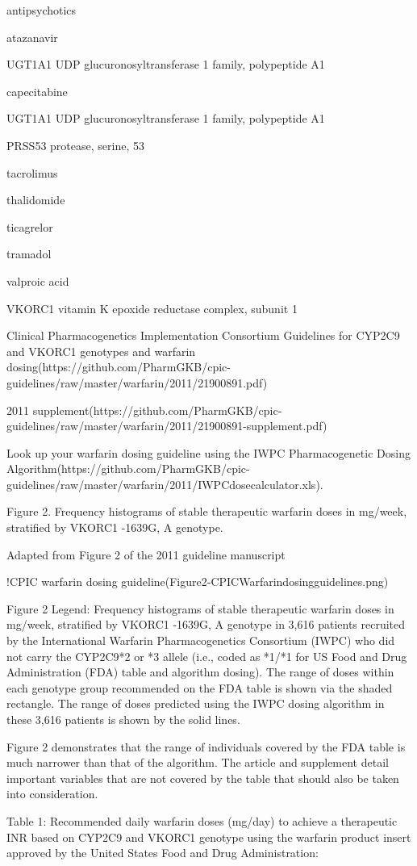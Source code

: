 \documentclass{resume} %
\begin{document}
\begin{rSection}{ antipsychotics }
\begin{rSection}{ atazanavir }
\begin{rSubsection}{ UGT1A1 }{ UDP glucuronosyltransferase 1 family, polypeptide A1 }{}{}
\begin{rSection}{ capecitabine }
\begin{rSubsection}{ UGT1A1 }{ UDP glucuronosyltransferase 1 family, polypeptide A1 }{}{}
\begin{rSubsection}{ PRSS53 }{ protease, serine, 53 }{}{}
\begin{rSection}{ tacrolimus }
\begin{rSection}{ thalidomide }
\begin{rSection}{ ticagrelor }
\begin{rSection}{ tramadol }
\begin{rSection}{ valproic acid }
\begin{rSubsection}{ VKORC1 }{ vitamin K epoxide reductase complex, subunit 1 }{}{}
\item Clinical Pharmacogenetics Implementation Consortium Guidelines for CYP2C9 and VKORC1 genotypes and warfarin dosing(https://github.com/PharmGKB/cpic-guidelines/raw/master/warfarin/2011/21900891.pdf)
 \newline
\item 2011 supplement(https://github.com/PharmGKB/cpic-guidelines/raw/master/warfarin/2011/21900891-supplement.pdf)
 \newline
\item Look up your warfarin dosing guideline using the IWPC Pharmacogenetic Dosing Algorithm(https://github.com/PharmGKB/cpic-guidelines/raw/master/warfarin/2011/IWPCdosecalculator.xls).
 \newline
\item Figure 2. Frequency histograms of stable therapeutic warfarin doses in mg/week, stratified by VKORC1 -1639G, A genotype.
 \newline
\item Adapted from Figure 2 of the 2011 guideline manuscript
 \newline
\item !CPIC warfarin dosing guideline(Figure2-CPICWarfarindosingguidelines.png)
 \newline
\item Figure 2 Legend: Frequency histograms of stable therapeutic warfarin doses in mg/week, stratified by VKORC1 -1639G, A genotype in 3,616 patients recruited by the International Warfarin Pharmacogenetics Consortium (IWPC) who did not carry the CYP2C9*2 or *3 allele (i.e., coded as *1/*1 for US Food and Drug Administration (FDA) table and algorithm dosing). The range of doses within each genotype group recommended on the FDA table is shown via the shaded rectangle. The range of doses predicted using the IWPC dosing algorithm in these 3,616 patients is shown by the solid lines.
 \newline
\item Figure 2 demonstrates that the range of individuals covered by the FDA table is much narrower than that of the algorithm. The article and supplement detail important variables that are not covered by the table that should also be taken into consideration.
 \newline
\item Table 1: Recommended daily warfarin doses (mg/day) to achieve a therapeutic INR based on CYP2C9 and VKORC1 genotype using the warfarin product insert approved by the United States Food and Drug Administration:

\end{rSubsection}
\end{rSection}
\end{rSection}
\end{rSection}
\end{rSection}
\end{rSection}
\end{rSubsection}
\end{rSubsection}
\end{rSection}
\end{rSubsection}
\end{rSection}
\end{rSection}
\end{document}
